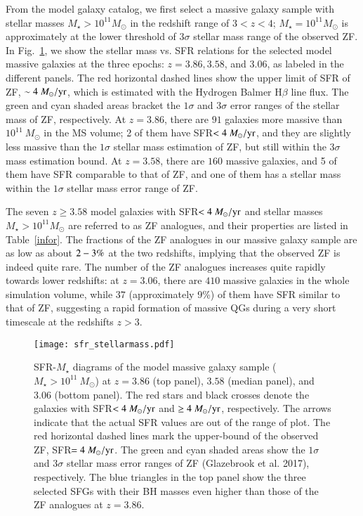 \documentclass[useAMS,usenatbib]{mn2e}
\begin{document}
From the model galaxy catalog, we first select a massive galaxy sample with stellar masses $M_{\star}>10^{11}M_{\odot}$ in the redshift range of $3<z<4$; $M_{\star}=10^{11}M_{\odot}$ is approximately at the lower threshold of $3\sigma$ stellar mass range of the observed ZF. In Fig.~\ref{sfr_stellarmass}, we show the stellar mass vs. SFR relations for the selected model massive galaxies at the three epochs: $z=3.86,3.58$, and $3.06$, as labeled in the different panels. The red horizontal dashed lines show the upper limit of SFR of ZF, $\sim 4\ M_{\odot}/\rm{yr}$, which is estimated with the Hydrogen Balmer H$\beta$ line flux. The green and cyan shaded areas bracket the $1\sigma$ and $3\sigma$ error ranges of the stellar mass of ZF, respectively. At $z=3.86$, there are $91$ galaxies more massive than $10^{11}\ M_{\odot}$ in the MS volume; 2 of them have SFR$<4\ M_{\odot}/\rm{yr}$, and they are slightly less massive than the $1\sigma$ stellar mass estimation of ZF, but still within the $3\sigma$ mass estimation bound. At $z=3.58$, there are $160$ massive galaxies, and 5 of them have SFR comparable to that of ZF, and one of them has a stellar mass within the $1\sigma$ stellar mass error range of ZF.

The seven $z\geq 3.58$ model galaxies with SFR$<4\ M_{\odot}/\rm{yr}$ and stellar masses $M_{\star}>10^{11}M_{\odot}$ are referred to as ZF analogues, and their properties are listed in Table~\ref{infor}. The fractions of the ZF analogues in our massive galaxy sample are as low as about $2\--3\%$ at the two redshifts, implying that the observed ZF is indeed quite rare. The number of the ZF analogues increases quite rapidly towards lower redshifts: at $z=3.06$, there are $410$ massive galaxies in the whole simulation volume, while $37$ (approximately 9\%) of them have SFR similar to that of ZF, suggesting a rapid formation of massive QGs during a very short timescale at the redshifts $z>3$.

\begin{figure}
\centering
\texttt{[image: sfr\_stellarmass.pdf]}
\caption{SFR-$M_{\star}$ diagrams of the model massive galaxy sample ($M_{\star}>10^{11}\ M_{\odot}$) at $z=3.86$ (top panel), $3.58$ (median panel), and $3.06$ (bottom panel). The red stars and black crosses denote the galaxies with SFR$<4\ M_{\odot}/\rm{yr}$ and $\geq 4\ M_{\odot}/\rm{yr}$, respectively. The arrows indicate that the actual SFR values are out of the range of plot. The red horizontal dashed lines mark the upper-bound of the observed ZF, SFR$=4\ M_{\odot}/\rm{yr}$. The green and cyan shaded areas show the $1\sigma$ and $3\sigma$ stellar mass error ranges of ZF (Glazebrook et al. 2017), respectively. The blue triangles in the top panel show the three selected SFGs with their BH masses even higher than those of the ZF analogues at $z=3.86$.}
\label{sfr_stellarmass}
\end{figure}
\end{document}
